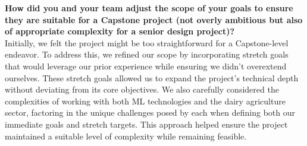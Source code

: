 \documentclass{article}
\begin{document}
\textbf{How did you and your team adjust the scope of your goals to ensure
they are suitable for a Capstone project (not overly ambitious but also of
appropriate complexity for a senior design project)?} \\
Initially, we felt the project might be too straightforward for a 
Capstone-level endeavor. To address this, we refined our scope by incorporating 
stretch goals that would leverage our prior experience while ensuring we didn't 
overextend ourselves. These stretch goals allowed us to expand the project's 
technical depth without deviating from its core objectives. We also carefully 
considered the complexities of working with both ML technologies and the dairy 
agriculture sector, factoring in the unique challenges posed by each when 
defining both our immediate goals and stretch targets. This approach helped 
ensure the project maintained a suitable level of complexity while remaining 
feasible.
\end{document}
